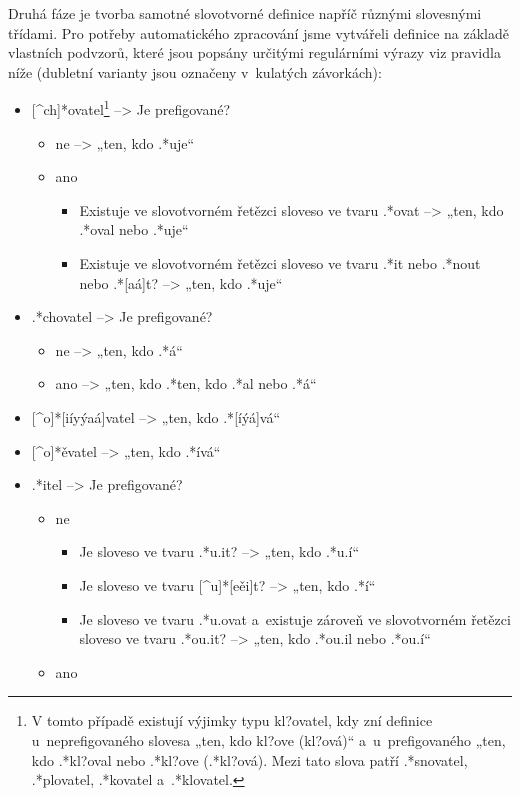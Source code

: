 Druhá fáze je tvorba samotné slovotvorné definice napříč různými
slovesnými třídami. Pro potřeby automatického zpracování jsme vytvářeli
definice na základě vlastních podvzorů, které jsou popsány určitými
regulárními výrazy viz pravidla níže (dubletní varianty jsou označeny
v~kulatých závorkách):

\begin{itemize}
\tightlist
\item
  {[}\^{}ch{]}*ovatel\footnote{V tomto případě existují výjimky typu kl?ovatel, kdy zní definice u~neprefigovaného slovesa „ten, kdo kl?ove (kl?ová)“ a~u~prefigovaného „ten, kdo .*kl?oval nebo .*kl?ove (.*kl?ová). Mezi tato slova patří .*snovatel, .*plovatel, .*kovatel a~.*klovatel.}
  --\textgreater{} Je prefigované?

  \begin{itemize}
  \tightlist
  \item
    ne --\textgreater{} „ten, kdo .*uje``
  \item
    ano

    \begin{itemize}
    \tightlist
    \item
      Existuje ve slovotvorném řetězci sloveso ve tvaru .*ovat
      --\textgreater{} „ten, kdo .*oval nebo .*uje``
    \item
      Existuje ve slovotvorném řetězci sloveso ve tvaru .*it nebo .*nout
      nebo .*{[}aá{]}t? --\textgreater{} „ten, kdo .*uje``
    \end{itemize}
  \end{itemize}
\item
  .*chovatel --\textgreater{} Je prefigované?

  \begin{itemize}
  \tightlist
  \item
    ne --\textgreater{} „ten, kdo .*á``
  \item
    ano --\textgreater{} „ten, kdo .*ten, kdo .*al nebo .*á``
  \end{itemize}
\item
  {[}\^{}o{]}*{[}iíyýaá{]}vatel --\textgreater{} „ten, kdo
  .*{[}íýá{]}vá``
\item
  {[}\^{}o{]}*ěvatel --\textgreater{} „ten, kdo .*ívá``
\item
  .*itel --\textgreater{} Je prefigované?

  \begin{itemize}
  \tightlist
  \item
    ne

    \begin{itemize}
    \tightlist
    \item
      Je sloveso ve tvaru .*u.it? --\textgreater{} „ten, kdo .*u.í``
    \item
      Je sloveso ve tvaru {[}\^{}u{]}*{[}eěi{]}t? --\textgreater{} „ten,
      kdo .*í``
    \item
      Je sloveso ve tvaru .*u.ovat a~existuje zároveň ve slovotvorném
      řetězci sloveso ve tvaru .*ou.it? --\textgreater{} „ten, kdo
      .*ou.il nebo .*ou.í``
    \end{itemize}
  \item
    ano


\end{itemize}
\end{itemize}
